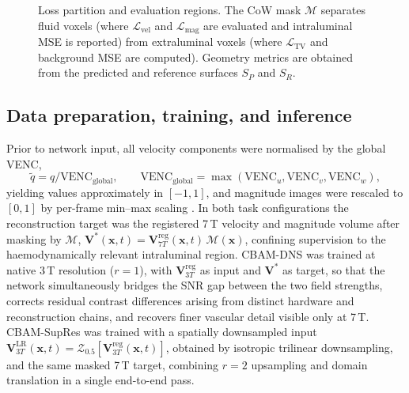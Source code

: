 \begin{figure}[!htbp]
    \centering
    \caption{Loss partition and evaluation regions. The CoW mask
    $\mathcal{M}$ separates fluid voxels (where
    $\mathcal{L}_{\text{vel}}$ and $\mathcal{L}_{\text{mag}}$ are
    evaluated and intraluminal MSE is reported) from extraluminal voxels
    (where $\mathcal{L}_{\text{TV}}$ and background MSE are computed).
    Geometry metrics are obtained from the predicted and reference
    surfaces $S_P$ and $S_R$.}
    \label{fig:loss}
\end{figure}

\subsection*{Data preparation, training, and inference}

Prior to network input, all velocity components were normalised by the
global VENC,
\begin{equation}
    \tilde{q} = q/\mathrm{VENC}_{\text{global}},
    \qquad
    \mathrm{VENC}_{\text{global}}
    = \max(\mathrm{VENC}_u,\mathrm{VENC}_v,\mathrm{VENC}_w),
\end{equation}
yielding values approximately in $[-1,1]$, and magnitude images were
rescaled to $[0,1]$ by per-frame min--max scaling
\cite{cardoso2022monai}. In both task configurations the reconstruction
target was the registered 7\,T velocity and magnitude volume after
masking by $\mathcal{M}$,
$\mathbf{V}^{*}(\mathbf{x},t)=\mathbf{V}^{\text{reg}}_{7T}(\mathbf{x},t)\,
\mathcal{M}(\mathbf{x})$, confining supervision to the haemodynamically
relevant intraluminal region. CBAM-DNS was trained at native 3\,T
resolution ($r=1$), with $\mathbf{V}^{\text{reg}}_{3T}$ as input and
$\mathbf{V}^{*}$ as target, so that the network simultaneously bridges
the SNR gap between the two field strengths, corrects residual contrast
differences arising from distinct hardware and reconstruction chains,
and recovers finer vascular detail visible only at 7\,T. CBAM-SupRes
was trained with a spatially downsampled input
$\mathbf{V}^{\mathrm{LR}}_{3T}(\mathbf{x},t)
 = \mathcal{Z}_{0.5}[\mathbf{V}^{\text{reg}}_{3T}(\mathbf{x},t)]$,
obtained by isotropic trilinear downsampling, and the same masked
7\,T target, combining $r=2$ upsampling and domain translation in a
single end-to-end pass.

